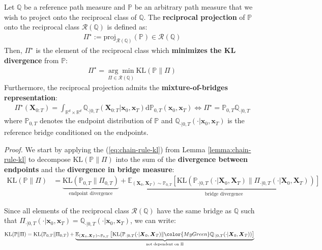 \documentclass{article}
\begin{document}
\begin{proposition}\label{prop:reciprocal-proj}
Let $\mathbb{Q}$ be a reference path measure and $\mathbb{P}$ be an arbitrary path measure that we wish to project onto the reciprocal class of $\mathbb{Q}$. The \textbf{reciprocal projection} of $\mathbb{P}$ onto the reciprocal class $\mathcal{R}(\mathbb{Q})$ is defined as:
\begin{align}
    \Pi^\star:=\text{proj}_{\mathcal{R}(\mathbb{Q})}(\mathbb{P})\in \mathcal{R}(\mathbb{Q})\tag{Reciprocal Projection}\label{eq:reciprocal-projection}
\end{align}
Then, $\Pi^\star$ is the element of the reciprocal class which \textbf{minimizes the KL divergence} from $\mathbb{P}$:
\begin{align}
    \Pi^\star=\underset{\Pi\in \mathcal{R}(\mathbb{Q})}{\arg\min}\text{KL}(\mathbb{P}\|\Pi)
\end{align}
Furthermore, the reciprocal projection admits the \textbf{mixture-of-bridges representation}:
\begin{align}
    \Pi^\star(\boldsymbol{X}_{0:T})=\int_{\mathbb{R}^d\times \mathbb{R}^d}\mathbb{Q}_{\cdot|0,T}(\boldsymbol{X}_{0:T}|\boldsymbol{x}_0, \boldsymbol{x}_T)\mathrm{d}\mathbb{P}_{0,T}(\boldsymbol{x}_0, \boldsymbol{x}_T) \iff \Pi^\star=\mathbb{P}_{0,T}\mathbb{Q}_{\cdot|0,T}\label{eq:reciprocal-projection-2}
\end{align}
where $\mathbb{P}_{0,T}$ denotes the endpoint distribution of $\mathbb{P}$ and $\mathbb{Q}_{\cdot|0,T}(\cdot|\boldsymbol{x}_0, \boldsymbol{x}_T)$ is the reference bridge conditioned on the endpoints. 
\end{proposition}

\textit{Proof.} We start by applying the (\ref{eq:chain-rule-kl}) from Lemma \ref{lemma:chain-rule-kl} to decompose $\text{KL}(\mathbb{P}\|\Pi)$ into the sum of the \textbf{divergence between endpoints} and the \textbf{divergence in bridge measure}:
\begin{align}
    \text{KL}(\mathbb{P}\|\Pi)&=\underbrace{\text{KL}(\mathbb{P}_{0,T}\|\Pi_{0,T})}_{\text{endpoint divergence}}+\underbrace{\mathbb{E}_{(\boldsymbol{X}_0, \boldsymbol{X}_T)\sim\mathbb{P}_{0,T}}\left[\text{KL}(\mathbb{P}_{\cdot|0,T}(\cdot|\boldsymbol{X}_0, \boldsymbol{X}_T)\|\Pi_{\cdot|0,T}(\cdot|\boldsymbol{X}_0, \boldsymbol{X}_T))\right]}_{\text{bridge divergence}}
\end{align}

Since all elements of the reciprocal class $\mathcal{R}(\mathbb{Q})$ have the same bridge as $\mathbb{Q}$ such that $\Pi_{\cdot|0,T}(\cdot|\boldsymbol{x}_0, \boldsymbol{x}_T)=\mathbb{Q}_{\cdot|0,T}(\cdot|\boldsymbol{x}_0, \boldsymbol{x}_T)$, we can write:
\begin{align}
    \text{KL}(\mathbb{P}\|\Pi)&=\text{KL}(\mathbb{P}_{0,T}\|\Pi_{0,T})+\underbrace{\mathbb{E}_{(\boldsymbol{X}_0, \boldsymbol{X}_T)\sim \mathbb{P}_{0,T}}\left[\text{KL}(\mathbb{P}_{\cdot|0,T}(\cdot|\boldsymbol{X}_0, \boldsymbol{X}_T)\|{\color{MyGreen}\mathbb{Q}_{\cdot|0,T}(\cdot|\boldsymbol{X}_0, \boldsymbol{X}_T)})\right]}_{\text{not dependent on $\Pi$}}
\end{align}
\end{document}
